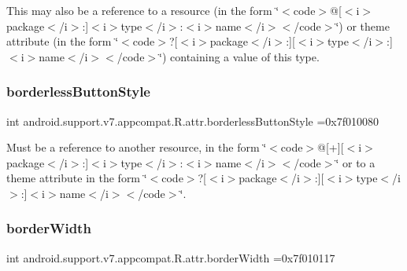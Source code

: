 This may also be a reference to a resource (in the form \char`\"{}$<$code$>$@\mbox{[}$<$i$>$package$<$/i$>$\+:\mbox{]}$<$i$>$type$<$/i$>$\+:$<$i$>$name$<$/i$>$$<$/code$>$\char`\"{}) or theme attribute (in the form \char`\"{}$<$code$>$?\mbox{[}$<$i$>$package$<$/i$>$\+:\mbox{]}\mbox{[}$<$i$>$type$<$/i$>$\+:\mbox{]}$<$i$>$name$<$/i$>$$<$/code$>$\char`\"{}) containing a value of this type. \mbox{\label{classandroid_1_1support_1_1v7_1_1appcompat_1_1R_1_1attr_a4a7129bedf5616c7e7d42c253187a694}} 
\subsubsection{\texorpdfstring{borderless\+Button\+Style}{borderlessButtonStyle}}
{\footnotesize\ttfamily int android.\+support.\+v7.\+appcompat.\+R.\+attr.\+borderless\+Button\+Style =0x7f010080\hspace{0.3cm}{\ttfamily [static]}}

Must be a reference to another resource, in the form \char`\"{}$<$code$>$@\mbox{[}+\mbox{]}\mbox{[}$<$i$>$package$<$/i$>$\+:\mbox{]}$<$i$>$type$<$/i$>$\+:$<$i$>$name$<$/i$>$$<$/code$>$\char`\"{} or to a theme attribute in the form \char`\"{}$<$code$>$?\mbox{[}$<$i$>$package$<$/i$>$\+:\mbox{]}\mbox{[}$<$i$>$type$<$/i$>$\+:\mbox{]}$<$i$>$name$<$/i$>$$<$/code$>$\char`\"{}. \mbox{\label{classandroid_1_1support_1_1v7_1_1appcompat_1_1R_1_1attr_a55e8c33b36302cff431e988e21390c49}} 
\subsubsection{\texorpdfstring{border\+Width}{borderWidth}}
{\footnotesize\ttfamily int android.\+support.\+v7.\+appcompat.\+R.\+attr.\+border\+Width =0x7f010117\hspace{0.3cm}{\ttfamily [static]}}

